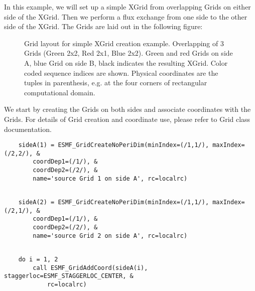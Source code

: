    In this example, we will set up a simple XGrid from overlapping Grids on
   either side of the XGrid. Then we perform a flux exchange from one side
   to the other side of the XGrid. The Grids are laid out in the following figure:
  \begin{center}
  \begin{figure}
  \center
  \caption{Grid layout for simple XGrid creation example. Overlapping of 3 Grids
  (Green 2x2, Red 2x1, Blue 2x2). Green and red Grids on side A, blue Grid on side
  B, black indicates the resulting XGrid. Color coded sequence indices are shown.
  Physical coordinates are the tuples in parenthesis, e.g. at the four
  corners of rectangular computational domain.}
  \label{fig:xgridsimple}
  \end{figure}
  \end{center}
  
   We start by creating the Grids on both sides and associate coordinates with
   the Grids. For details of Grid creation and coordinate use, please refer to
   Grid class documentation. 

 \begin{verbatim}
    sideA(1) = ESMF_GridCreateNoPeriDim(minIndex=(/1,1/), maxIndex=(/2,2/), &
        coordDep1=(/1/), &
        coordDep2=(/2/), &
        name='source Grid 1 on side A', rc=localrc)
 
\end{verbatim}
 

 \begin{verbatim}
    sideA(2) = ESMF_GridCreateNoPeriDim(minIndex=(/1,1/), maxIndex=(/2,1/), &
        coordDep1=(/1/), &
        coordDep2=(/2/), &
        name='source Grid 2 on side A', rc=localrc)
 
\end{verbatim}
 

 \begin{verbatim}
    do i = 1, 2
        call ESMF_GridAddCoord(sideA(i), staggerloc=ESMF_STAGGERLOC_CENTER, &
            rc=localrc)
 
\end{verbatim}
 

